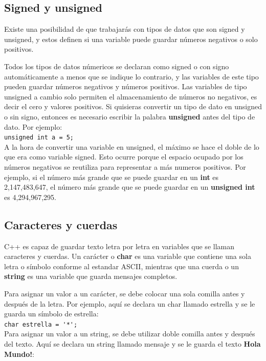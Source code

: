\documentclass{article}
\begin{document}
\subsection{Signed y unsigned}

Existe una posibilidad de que trabajarás con tipos de datos que son signed y unsigned, y estos definen si una variable puede guardar números negativos o solo positivos.

Todos los tipos de datos númericos se declaran como signed o con signo automáticamente a menos que se indique lo contrario, y las variables de este tipo pueden guardar números negativos y números positivos. Las variables de tipo unsigned a cambio solo permiten el almacenamiento de números no negativos, es decir el cero y valores positivos. Si quisieras convertir un tipo de dato en unsigned o sin signo, entonces es necesario escribir la palabra \textbf{unsigned} antes del tipo de dato. Por ejemplo: \\

\lstinline{unsigned int a = 5;} \\

A la hora de convertir una variable en unsigned, el máximo se hace el doble de lo que era como variable signed. Esto ocurre porque el espacio ocupado por los números negativos se reutiliza para representar a más numeros positivos. Por ejemplo, si el número más grande que se puede guardar en un \textbf{int} es 2,147,483,647, el número más grande que se puede guardar en un \textbf{unsigned int} es 4,294,967,295.

\subsection{Caracteres y cuerdas}

C++ es capaz de guardar texto letra por letra en variables que se llaman caracteres y cuerdas. Un carácter o \textbf{char} es una variable que contiene una sola letra o símbolo conforme al estandar ASCII, mientras que una cuerda o un \textbf{string} es una variable que guarda mensajes completos.

Para asignar un valor a un carácter, se debe colocar una sola comilla antes y después de la letra. Por ejemplo, aquí se declara un char llamado estrella y se le guarda un símbolo de estrella: \\

\lstinline{char estrella = '*';} \\

Para asignar un valor a un string, se debe utilizar doble comilla antes y después del texto. Aquí se declara un string llamado mensaje y se le guarda el texto \textbf{Hola Mundo!}: \\
\end{document}
